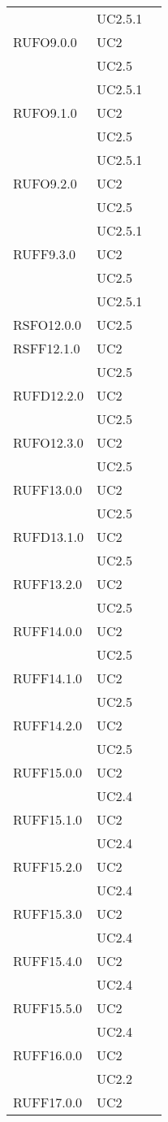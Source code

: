 \begin{center}
\begin{longtable}{lp{}l}
 & UC2.5.1 \\
RUFO9.0.0 & UC2 \\
 & UC2.5 \\
 & UC2.5.1 \\
RUFO9.1.0 & UC2 \\
 & UC2.5 \\
 & UC2.5.1 \\
RUFO9.2.0 & UC2 \\
 & UC2.5 \\
 & UC2.5.1 \\
RUFF9.3.0 & UC2 \\
 & UC2.5 \\
 & UC2.5.1 \\
RSFO12.0.0 & UC2.5 \\
RSFF12.1.0 & UC2 \\
 & UC2.5 \\
RUFD12.2.0 & UC2 \\
 & UC2.5 \\
RUFO12.3.0 & UC2 \\
 & UC2.5 \\
RUFF13.0.0 & UC2 \\
 & UC2.5 \\
RUFD13.1.0 & UC2 \\
 & UC2.5 \\
RUFF13.2.0 & UC2 \\
 & UC2.5 \\
RUFF14.0.0 & UC2 \\
 & UC2.5 \\
RUFF14.1.0 & UC2 \\
 & UC2.5 \\
RUFF14.2.0 & UC2 \\
 & UC2.5 \\
RUFF15.0.0 & UC2 \\
 & UC2.4 \\
RUFF15.1.0 & UC2 \\
 & UC2.4 \\
RUFF15.2.0 & UC2 \\
 & UC2.4 \\
RUFF15.3.0 & UC2 \\
 & UC2.4 \\
RUFF15.4.0 & UC2 \\
 & UC2.4 \\
RUFF15.5.0 & UC2 \\
 & UC2.4 \\
RUFF16.0.0 & UC2 \\
 & UC2.2 \\
RUFF17.0.0 & UC2 \\

\end{longtable}
\end{center}
